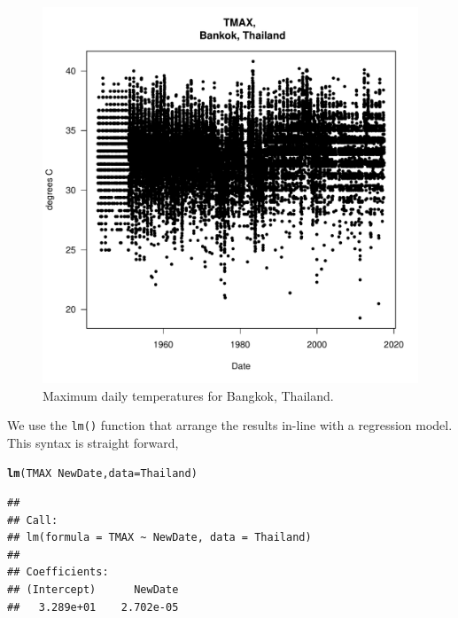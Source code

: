 \documentclass{article}\usepackage[]{graphicx}\usepackage[]{color}
\makeatletter
\def\maxwidth{ %
  \ifdim\Gin@nat@width>\linewidth
    \linewidth
  \else
    \Gin@nat@width
  \fi
}
\newcommand{\hlopt}[1]{\textcolor[rgb]{0,0,0}{#1}}%
\newcommand{\hlstd}[1]{\textcolor[rgb]{0.345,0.345,0.345}{#1}}%
\newcommand{\hlkwc}[1]{\textcolor[rgb]{0.333,0.667,0.333}{#1}}%
\newcommand{\hlkwd}[1]{\textcolor[rgb]{0.737,0.353,0.396}{\textbf{#1}}}%
\newenvironment{kframe}{%
 \def\at@end@of@kframe{}%
 \ifinner\ifhmode%
  \def\at@end@of@kframe{\end{minipage}}%
  \begin{minipage}{\columnwidth}%
 \fi\fi%
 \def\FrameCommand##1{\hskip\@totalleftmargin \hskip-\fboxsep
 \colorbox{shadecolor}{##1}\hskip-\fboxsep
     \hskip-\linewidth \hskip-\@totalleftmargin \hskip\columnwidth}%
 \MakeFramed {\advance\hsize-\width
   \@totalleftmargin\z@ \linewidth\hsize
   \@setminipage}}%
 {\par\unskip\endMakeFramed%
 \at@end@of@kframe}
\newenvironment{knitrout}{}{} %
\makeatother
\begin{document}
\begin{figure}
\label{fig:test12}
\caption{Maximum daily temperatures for Bangkok, Thailand.}
\begin{knitrout}
\color{fgcolor}
\includegraphics[width=\maxwidth]{figure/Tmaxplot-1} 

\end{knitrout}
\end{figure}

We use the \texttt{lm()} function that arrange the results in-line with a regression model. This syntax is  straight forward,  

\begin{knitrout}
\color{fgcolor}\begin{kframe}
\begin{alltt}
\hlkwd{lm}\hlstd{(TMAX} \hlopt{~} \hlstd{NewDate,} \hlkwc{data}\hlstd{=Thailand)}
\end{alltt}
\begin{verbatim}
## 
## Call:
## lm(formula = TMAX ~ NewDate, data = Thailand)
## 
## Coefficients:
## (Intercept)      NewDate  
##   3.289e+01    2.702e-05
\end{verbatim}
\end{kframe}
\end{knitrout}
\end{document}

